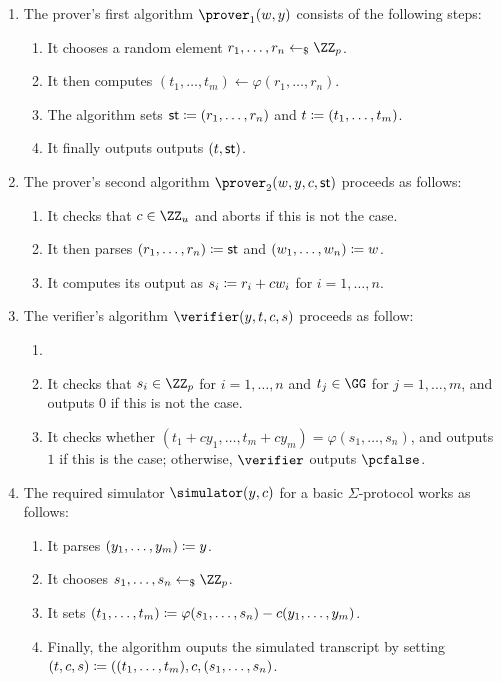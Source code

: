 \documentclass[runningheads]{llncs}
\begin{document}
\begin{enumerate}
  \item\label{item:basic:p1}
    The prover's first algorithm $\prover_1(w,y)$ consists of the following steps:
    \begin{enumerate}
      \item\label{item:basic:p1:randomness}
        It chooses a random element $r_1,\dots,r_n\getsr\ZZ_p$.
      \item
        It then computes $(t_1,\dots,t_m)\gets\varphi(r_1,\dots,r_n)$.
      \item
	The algorithm sets $\mathsf{st}\coloneqq (r_1,\dots,r_n)$ and $t\coloneqq(t_1,\dots,t_m)$.
      \item
        It finally outputs outputs $(t,\mathsf{st})$.
    \end{enumerate}
  \item\label{item:basic:p2}
    The prover's second algorithm $\prover_2(w,y,c,\st)$ proceeds as follows:
    \begin{enumerate}
      \item
        It checks that $c\in\ZZ_u$ and aborts if this is not the case.
      \item
	It then parses $(r_1,\dots,r_n)\coloneqq \mathsf{st}$ and $(w_1,\dots,w_n)\coloneqq w$.
      \item
        It computes its output as $s_i\coloneqq r_i+cw_i$ for $i=1,\dots,n$.
    \end{enumerate}
  \item\label{item:basic:v}
    The verifier's algorithm $\verifier(y,t,c,s)$ proceeds as follow:
    \begin{enumerate}
      \item
      \item\label{item:basic:v:checks}
        It checks that $s_i\in\ZZ_p$ for $i=1,\dots,n$ and $t_j\in\GG$ for $j=1,\dots,m$, and outputs $0$ if this is not the case.
      \item
	It checks whether $(t_1 + cy_1,\dots,t_m + cy_m) = \varphi(s_1,\dots,s_n)$, and outputs $1$ if this is the case; otherwise, $\verifier$ outputs $\reject$.
    \end{enumerate}
  \item\label{item:basic:sim}
    The required simulator $\simulator(y,c)$ for a basic $\Sigma$-protocol works as follows:
    \begin{enumerate}
      \item
        It parses $(y_1,\dots,y_m)\coloneqq y$.
      \item\label{item:basic:sim:s}
        It chooses $s_1,\dots,s_n\getsr\ZZ_p$.
      \item
        It sets $(t_1,\dots,t_m) \coloneqq \varphi(s_1,\dots,s_n) - c(y_1,\dots,y_m)$.
      \item
        Finally, the algorithm ouputs the simulated transcript by setting $(t,c,s)\coloneqq((t_1,\dots,t_m),c,(s_1,\dots,s_n)$.
    \end{enumerate}
\end{enumerate}
\end{document}
